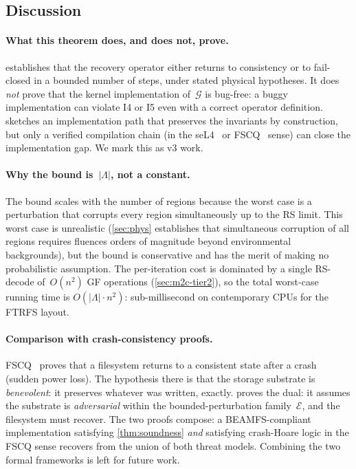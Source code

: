 \subsection{Discussion}

\paragraph{What this theorem does, and does not, prove.}
 establishes that the recovery operator either
returns to consistency or to fail-closed in a bounded number of
steps, under stated physical hypotheses. It does \emph{not} prove
that the kernel implementation of~\(\mathcal{G}\) is bug-free: a
buggy implementation can violate I4 or I5 even with a correct
operator definition.  sketches an implementation
path that preserves the invariants by construction, but only a
verified compilation chain (in the seL4~\cite{klein2009sel4} or
FSCQ~\cite{chen2015fscq} sense) can close the implementation gap.
We mark this as v3 work.

\paragraph{Why the bound is~\(|\Lambda|\), not a constant.}
The bound scales with the number of regions because the worst case is
a perturbation that corrupts every region simultaneously up to the
RS limit. This worst case is unrealistic (\cref{sec:phys} establishes
that simultaneous corruption of all regions requires fluences
orders of magnitude beyond environmental backgrounds), but the bound
is conservative and has the merit of making no probabilistic
assumption. The per-iteration cost is dominated by a single
RS-decode of~\(O(n^{2})\) GF operations
(\cref{sec:m2c-tier2}), so the total worst-case running time is
\(O(|\Lambda| \cdot n^{2})\): sub-millisecond on contemporary CPUs
for the FTRFS layout.

\paragraph{Comparison with crash-consistency proofs.}
FSCQ~\cite{chen2015fscq} proves that a filesystem returns to a
consistent state after a crash (sudden power loss). The hypothesis
there is that the storage substrate is \emph{benevolent}: it
preserves whatever was written, exactly. 
proves the dual: it assumes the substrate is \emph{adversarial}
within the bounded-perturbation family~\(\mathcal{E}\), and the
filesystem must recover. The two proofs compose: a BEAMFS-compliant
implementation satisfying \cref{thm:soundness} \emph{and} satisfying
crash-Hoare logic in the FSCQ sense recovers from the union of
both threat models. Combining the two formal frameworks is left
for future work.
